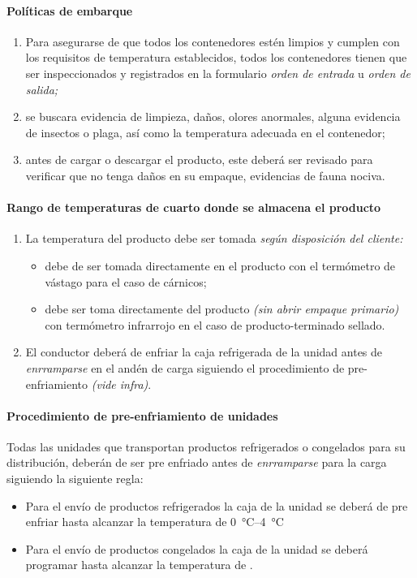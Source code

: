 \paragraph{Políticas de embarque}
\begin{enumerate}
	\item Para asegurarse de que todos los contenedores estén limpios y cumplen con los requisitos de temperatura establecidos, todos los contenedores tienen que ser inspeccionados y registrados en la formulario \emph{orden de entrada} u \emph{orden de salida;}
	\item se buscara evidencia de limpieza, daños, olores anormales, alguna evidencia de insectos o plaga, así como la temperatura adecuada en el contenedor;
	\item antes de cargar o descargar el producto, este deberá ser revisado para verificar que no tenga daños en su empaque, evidencias de fauna nociva.
\end{enumerate}


\paragraph{Rango de temperaturas de cuarto donde se almacena el producto}
\begin{enumerate}
	\item La temperatura del producto debe ser tomada \emph{según disposición del cliente:}
	\begin{itemize}
		\item debe de ser tomada directamente en el producto con el termómetro de vástago para el caso de cárnicos;
		\item debe ser toma directamente del producto \emph{(sin abrir empaque primario)} con termómetro infrarrojo en el caso de \gls{producto-terminado} sellado.
	\end{itemize}
	\item El conductor deberá de enfriar la caja refrigerada de la unidad antes de \textit{enrramparse} en el andén de carga siguiendo el procedimiento de pre-enfriamiento \textit{(vide infra)}.
\end{enumerate}

\paragraph{Procedimiento de pre-enfriamiento de unidades}
Todas las unidades que transportan productos refrigerados o congelados para su distribución, deberán de ser pre enfriado antes de \textit{enrramparse} para la carga siguiendo la siguiente regla:
\begin{itemize}
	\item Para el envío de productos refrigerados la caja de la unidad se deberá de pre enfriar hasta alcanzar la temperatura de \qtyrange{0}{4}{\celsius}
	\item Para el envío de productos congelados la caja de la unidad se deberá programar hasta alcanzar la temperatura de .
\end{itemize}

